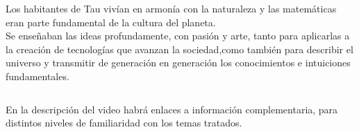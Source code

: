 \documentclass[preview]{standalone}
\begin{document}
\begin{center}
Los habitantes de Tau vivían en armonía con la naturaleza y las matemáticas eran parte fundamental de la cultura del planeta. 
$$ $$ 
Se enseñaban las ideas profundamente, con pasión y arte, tanto para aplicarlas a la creación de tecnologías que avanzan la sociedad,como también para describir el universo  y transmitir de generación en generación los conocimientos e intuiciones fundamentales. 

$$ $$ 

En la descripción del video habrá enlaces a información complementaria, para distintos niveles de familiaridad con los temas tratados. 

$$ $$
\end{center}
\end{document}
